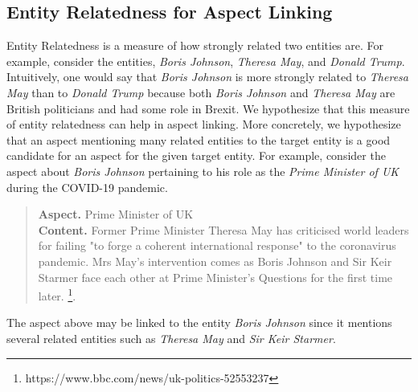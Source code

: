 \subsection{Entity Relatedness for Aspect Linking}
\label{subsec:Entity Relatedness for Aspect Linking}



Entity Relatedness is a measure of how strongly related two entities are. For example, consider the entities, \textit{Boris Johnson}, \textit{Theresa May}, and \textit{Donald Trump}. Intuitively, one would say that \textit{Boris Johnson} is more strongly related to \textit{Theresa May} than to \textit{Donald Trump} because both \textit{Boris Johnson} and \textit{Theresa May} are British politicians and had some role in Brexit. We hypothesize that this measure of entity relatedness can help in aspect linking. More concretely, we hypothesize that an aspect mentioning many related entities to the target entity  is a good candidate for an aspect for the given target entity. For example, consider the aspect about \textit{Boris Johnson} pertaining to his role as the \textit{Prime Minister of UK} during the COVID-19 pandemic.

\begin{quote}
    \textbf{Aspect.} Prime Minister of UK \\
    \textbf{Content.}
    Former Prime Minister Theresa May has criticised world leaders for failing "to forge a coherent international response" to the coronavirus pandemic. Mrs May's intervention comes as Boris Johnson and Sir Keir Starmer face each other at Prime Minister's Questions for the first time later. \footnote{https://www.bbc.com/news/uk-politics-52553237}.
\end{quote}
The aspect above may be linked to the entity \textit{Boris Johnson} since it mentions several related entities such as \textit{Theresa May} and \textit{Sir Keir Starmer}. 

